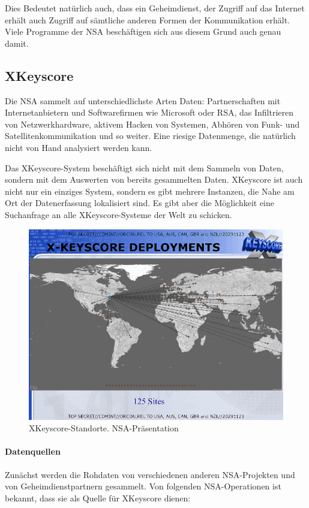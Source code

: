 \documentclass[12pt,a4paper]{scrartcl}
\begin{document}
Dies Bedeutet natürlich auch, dass ein Geheimdienst, der Zugriff auf das Internet erhält auch Zugriff auf sämtliche anderen Formen der Kommunikation erhält. Viele Programme der NSA beschäftigen sich aus diesem Grund auch genau damit.

\subsection{XKeyscore}
Die NSA sammelt auf unterschiedlichste Arten Daten: Partnerschaften mit Internetanbietern und Softwarefirmen wie Microsoft oder RSA, das Infiltrieren von Netzwerkhardware, aktivem Hacken von Systemen, Abhören von Funk- und Satellitenkommunikation und so weiter. Eine riesige Datenmenge, die natürlich nicht von Hand analysiert werden kann.

Das XKeyscore-System beschäftigt sich nicht mit dem Sammeln von Daten, sondern mit dem Auswerten von bereits gesammelten Daten. XKeyscore ist auch nicht nur ein einziges System, sondern es gibt mehrere Instanzen, die Nahe am Ort der Datenerfassung lokalisiert sind.\cite{nsa_xkeyscore} Es gibt aber die Möglichkeit eine Suchanfrage an alle XKeyscore-Systeme der Welt zu schicken.\cite{nsa_xksvoip}

\begin{figure}[H]
\centering
\includegraphics[width=\textwidth]{images/xks_sites.png}
\caption{XKeyscore-Standorte. NSA-Präsentation \cite{nsa_xksdeployments}}
\end{figure}

\paragraph{Datenquellen}
Zunächst werden die Rohdaten von verschiedenen anderen NSA-Projekten und von Geheimdienstpartnern gesammelt. Von folgenden NSA-Operationen ist bekannt, dass sie als Quelle für XKeyscore dienen:
\end{document}
